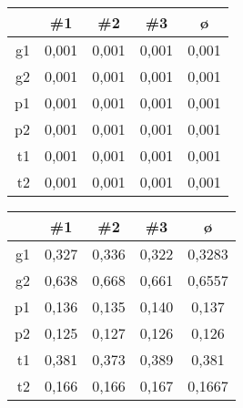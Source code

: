         \begin{center}
            \begin{tabular}{|r|S[table-format=1.3]|S[table-format=1.3]|S[table-format=1.3]|S[table-format=1.3]|}
                \hline
                 & {\#1} & {\#2} & {\#3} & ø \\\hline
                g1 & 0,001 & 0,001 & 0,001 & 0,001 \\\hline
                g2 & 0,001 & 0,001 & 0,001 & 0,001 \\\hline
                p1 & 0,001 & 0,001 & 0,001 & 0,001 \\\hline
                p2 & 0,001 & 0,001 & 0,001 & 0,001 \\\hline
                t1 & 0,001 & 0,001 & 0,001 & 0,001 \\\hline
                t2 & 0,001 & 0,001 & 0,001 & 0,001 \\\hline
            \end{tabular}
        \end{center}
        \begin{center}
            \begin{tabular}{|r|S[table-format=1.3]|S[table-format=1.3]|S[table-format=1.3]|S[table-format=1.4]|}
                \hline
                 & {\#1} & {\#2} & {\#3} & ø \\\hline
                g1 & 0,327 & 0,336 & 0,322 & 0,3283 \\\hline
                g2 & 0,638 & 0,668 & 0,661 & 0,6557 \\\hline
                p1 & 0,136 & 0,135 & 0,140 & 0,137  \\\hline
                p2 & 0,125 & 0,127 & 0,126 & 0,126  \\\hline
                t1 & 0,381 & 0,373 & 0,389 & 0,381  \\\hline
                t2 & 0,166 & 0,166 & 0,167 & 0,1667 \\\hline
            \end{tabular}
        \end{center}

